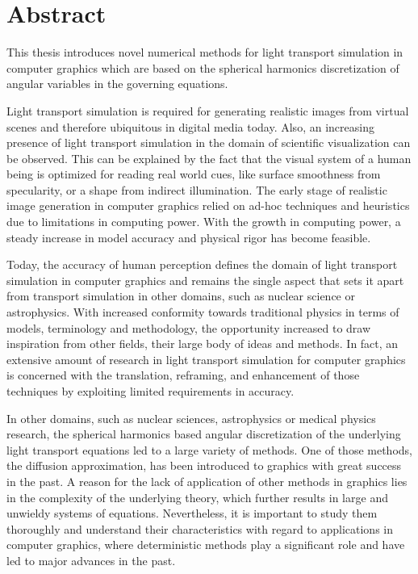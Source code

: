 \chapter*{Abstract}

%
%
This thesis introduces novel numerical methods for light transport simulation in computer graphics which are based on the spherical harmonics discretization of angular variables in the governing equations.

Light transport simulation is required for generating realistic images from virtual scenes and therefore ubiquitous in digital media today. Also, an increasing presence of light transport simulation in the domain of scientific visualization can be observed. This can be explained by the fact that the visual system of a human being is optimized for reading real world cues, like surface smoothness from specularity, or a shape from indirect illumination. The early stage of realistic image generation in computer graphics relied on ad-hoc techniques and heuristics due to limitations in computing power. With the growth in computing power, a steady increase in model accuracy and physical rigor has become feasible.

Today, the accuracy of human perception defines the domain of light transport simulation in computer graphics and remains the single aspect that sets it apart from transport simulation in other domains, such as nuclear science or astrophysics. With increased conformity towards traditional physics in terms of models, terminology and methodology, the opportunity increased to draw inspiration from other fields, their large body of ideas and methods. In fact, an extensive amount of research in light transport simulation for computer graphics is concerned with the translation, reframing, and enhancement of those techniques by exploiting limited requirements in accuracy.

In other domains, such as nuclear sciences, astrophysics or medical physics research, the spherical harmonics based angular discretization of the underlying light transport equations led to a large variety of methods. One of those methods, the diffusion approximation, has been introduced to graphics with great success in the past. A reason for the lack of application of other methods in graphics lies in the complexity of the underlying theory, which further results in large and unwieldy systems of equations. Nevertheless, it is important to study them thoroughly and understand their characteristics with regard to applications in computer graphics, where deterministic methods play a significant role and have led to major advances in the past.


